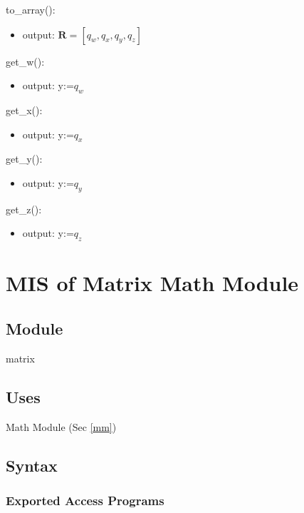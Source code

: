 \documentclass[12pt, titlepage]{article}
\begin{document}
\noindent to\_array():
\begin{itemize}
\item output: $\mathbf{R} = [q_w, q_x, q_y, q_z]$
\end{itemize}

\noindent get\_w():
\begin{itemize}
\item output: y:=$q_w$
\end{itemize}

\noindent get\_x():
\begin{itemize}
\item output: y:=$q_x$
\end{itemize}

\noindent get\_y():
\begin{itemize}
\item output: y:=$q_y$
\end{itemize}

\noindent get\_z():
\begin{itemize}
\item output: y:=$q_z$
\end{itemize}

\newpage

\section{MIS of Matrix Math Module} \label{mmm}

\subsection{Module}
matrix

\subsection{Uses}
Math Module (Sec \ref{mm})

\subsection{Syntax}

\subsubsection{Exported Access Programs}
\end{document}
